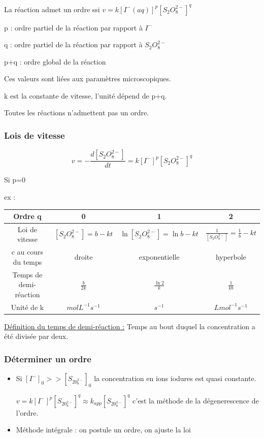 \documentclass{article}%
\begin{document}
La réaction admet un ordre ssi $v=k[I^-(aq)]^p[S_2O_8^{2-}]^q$

p : ordre partiel de la réaction par rapport à $I^-$

q : ordre partiel de la réaction par rapport à $S_2O_8^{2-}$

p+q : ordre global de la réaction

Ces valeurs sont liées aux paramètres microscopiques.

k est la constante de vitesse, l'unité dépend de p+q.

Toutes les réactions n'admettent pas un ordre.

\subsubsection{Lois de vitesse}

\[v=-\frac{d[S_2O_8^{2-}]}{dt}= k[I^-]^p[S_2O_8^{2-}]^q\]

Si p=0

ex :

\begin{tabular}{|c|ccc|}
\hline
Ordre q & 0 & 1 & 2\\
\hline
Loi de vitesse & $[S_2O_8^{2-}]=b-kt$ & $\ln [S_2O_8^{2-}] = \ln b -kt$ & $\frac{1}{[S_2O_8^{2-}]}=\frac{1}{b}-kt$\\
c au cours du temps & droite & exponentielle & hyperbole\\
Temps de demi-réaction & $\frac{b}{2k}$ & $\frac{\ln 2}{k}$ & $\frac{1}{kb}$\\
Unité de k & $molL^{-1}s^{-1}$ & $s^{-1}$ & $Lmol^{-1}s^{-1}$\\
\hline
\end{tabular}

\underline{Définition du temps de demi-réaction :} Temps au bout duquel la concentration a été divisée par deux.

\subsubsection{Déterminer un ordre}
\begin{itemize}

	\item Si $[I^-]_0 >> [S_20_8^{2-}]_0$ la concentration en ions iodures est quasi constante.

$v=k[I^-]^p[S_20_8^{2-}]^q \approx k_{app} [S_20_8^{2-}]^q$ c'est la méthode de la dégenerescence de l'ordre.

\item Méthode intégrale : on postule un ordre, on ajuste la loi

\end{itemize}
\end{document}
